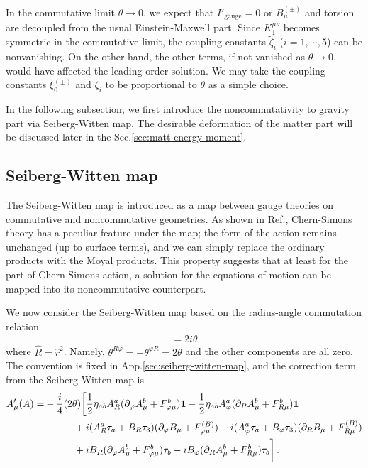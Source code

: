 \documentclass[11pt]{article}
\newcommand{\vap}{\varphi}
\newcommand{\nn}{\nonumber}
\numberwithin{equation}{section}
\begin{document}
In the commutative limit $\theta\rightarrow 0$, we expect that $I'_\text{gauge}=0$
or $B_\mu^{(\pm)}$ and torsion are decoupled from the usual Einstein-Maxwell part. 
Since $K_1^{\mu\nu}$ becomes symmetric in the commutative limit,
the coupling constants $\tilde{\zeta}_i$ ($i=1,\cdots,5$) can be nonvanishing.
On the other hand, the other terms, if not vanished as $\theta \to 0$, would have affected the leading order solution.  
We may take the coupling constants $\xi_0^{(\pm)}$ and $\zeta_i$ to be proportional to
$\theta$ as a simple choice.

In the following subsection,
we first introduce the noncommutativity to gravity part via Seiberg-Witten map.
The desirable deformation of the matter part will be discussed later in the Sec.\ref{sec:matt-energy-moment}.



\subsection{Seiberg-Witten map}
\label{sec:seiberg-witten-map-1}

The Seiberg-Witten map \cite{Seiberg:1999vs} is introduced as a map
between gauge theories on commutative and noncommutative geometries.
As shown in Ref.\cite{Grandi:2000av}, Chern-Simons
theory has a peculiar feature under the map; the form of the action remains
unchanged (up to surface terms), and we can simply replace the ordinary products
with the Moyal products.  
This property suggests that at least for the part of Chern-Simons
action, a solution for the equations of motion can be mapped into its noncommutative counterpart.

We now consider the Seiberg-Witten map  based on the
radius-angle commutation relation \cite{ChangYoung:2008my}
\begin{align}
  [ \hat{R} ,  \hat{\vap}] = 2i \theta 
\end{align}
where $\hat{R}= \hat{r}^2$.
Namely, $\theta^{R\vap}=-\theta^{\vap R}=2 \theta$ and the other
components are all zero.
The convention is fixed in App.\ref{sec:seiberg-witten-map}, and
the correction term from the Seiberg-Witten map is
\begin{align}
  A'_\mu(A)=&
-\frac{i}{4} (2\theta) \bigg[
\frac{1}{2} \eta_{ab} A_R^a (\partial_\vap A_\mu^b + F_{\vap \mu}^b) \bm{1}
-\frac{1}{2} \eta_{ab} A_\vap^a (\partial_R A_\mu^b + F_{R \mu}^b) \bm{1}
\nn\\& \hskip3em
+i (A_R^a \tau_a + B_R \tau_3) ( \partial_\vap B_\mu  + F_{\vap \mu}^{(B)} )
-i (A_\vap^a \tau_a + B_\vap \tau_3) ( \partial_R B_\mu  + F_{R \mu}^{(B)} )
\nn\\& \hskip3em
+i B_R (\partial_\vap A_\mu^b + F_{\vap \mu}^b)\tau_b
-i B_\vap (\partial_R A_\mu^b + F_{R \mu}^b)\tau_b
\bigg] \,.
\label{eq:SWmap2}
\end{align}
\end{document}

